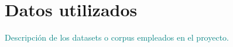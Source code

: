 \section{Datos utilizados}
\textcolor{teal}{Descripción de los datasets o corpus empleados en el proyecto.}
